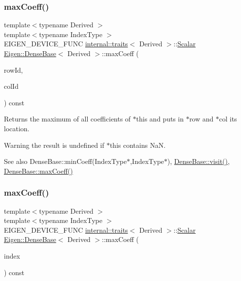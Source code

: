 \subsubsection{\texorpdfstring{maxCoeff()}{maxCoeff()}\hspace{0.1cm}{\footnotesize\ttfamily [2/3]}}
{\footnotesize\ttfamily template$<$typename Derived $>$ \\
template$<$typename Index\+Type $>$ \\
E\+I\+G\+E\+N\+\_\+\+D\+E\+V\+I\+C\+E\+\_\+\+F\+U\+NC \mbox{\hyperlink{struct_eigen_1_1internal_1_1traits}{internal\+::traits}}$<$ Derived $>$\+::\mbox{\hyperlink{class_eigen_1_1_dense_base_a5feed465b3a8e60c47e73ecce83e39a2}{Scalar}} \mbox{\hyperlink{class_eigen_1_1_dense_base}{Eigen\+::\+Dense\+Base}}$<$ Derived $>$\+::max\+Coeff (\begin{DoxyParamCaption}\item[{Index\+Type $\ast$}]{row\+Id,  }\item[{Index\+Type $\ast$}]{col\+Id }\end{DoxyParamCaption}) const}

\begin{DoxyReturn}{Returns}
the maximum of all coefficients of $\ast$this and puts in $\ast$row and $\ast$col its location. 
\end{DoxyReturn}
\begin{DoxyWarning}{Warning}
the result is undefined if {\ttfamily $\ast$this} contains NaN.
\end{DoxyWarning}
\begin{DoxySeeAlso}{See also}
Dense\+Base\+::min\+Coeff(\+Index\+Type$\ast$,\+Index\+Type$\ast$), \mbox{\hyperlink{class_eigen_1_1_dense_base_a7f73df3954a09c7ab0dca208b6b23ddd}{Dense\+Base\+::visit()}}, \mbox{\hyperlink{class_eigen_1_1_dense_base_ac0d151ec47eb7a44a3a5ba1587ddbeb4}{Dense\+Base\+::max\+Coeff()}} 
\end{DoxySeeAlso}
\mbox{\label{class_eigen_1_1_dense_base_ac7f03010f4e0891c90cdcfe123f45223}} 
\subsubsection{\texorpdfstring{maxCoeff()}{maxCoeff()}\hspace{0.1cm}{\footnotesize\ttfamily [3/3]}}
{\footnotesize\ttfamily template$<$typename Derived $>$ \\
template$<$typename Index\+Type $>$ \\
E\+I\+G\+E\+N\+\_\+\+D\+E\+V\+I\+C\+E\+\_\+\+F\+U\+NC \mbox{\hyperlink{struct_eigen_1_1internal_1_1traits}{internal\+::traits}}$<$ Derived $>$\+::\mbox{\hyperlink{class_eigen_1_1_dense_base_a5feed465b3a8e60c47e73ecce83e39a2}{Scalar}} \mbox{\hyperlink{class_eigen_1_1_dense_base}{Eigen\+::\+Dense\+Base}}$<$ Derived $>$\+::max\+Coeff (\begin{DoxyParamCaption}\item[{Index\+Type $\ast$}]{index }\end{DoxyParamCaption}) const}

